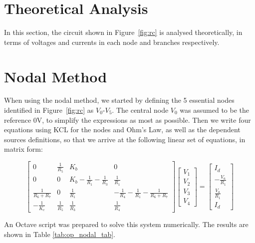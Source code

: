\section{Theoretical Analysis}
\label{sec:analysis}

In this section, the circuit shown in Figure~\ref{fig:rc} is analysed
theoretically, in terms of voltages and currents in each node and branches respectively.


\section{Nodal Method}

When using the nodal method, we started by defining the 5 essential nodes identified in Figure~\ref{fig:rc} as $V_0$-$V_5$. The central node $V_0$ was assumed to be the reference 0V, to simplify the expressions as most as possible.
Then we write four equations using KCL for the nodes and Ohm's Law, as well as the dependent sources definitions, so that we arrive at the following linear set of equations, in matrix form:


\[
  \begin{bmatrix}
    0                   & \frac{1}{R_5} & K_b                                 & 0                                              \\
    0                   & 0             & K_b - \frac{1}{R_1} - \frac{1}{R_3} & \frac{1}{R_1}                                  \\
    \frac{1}{R_6 + R_7} & 0             & \frac{1}{R_1}                       & -\frac{1}{R_4}-\frac{1}{R_1}-\frac{1}{R_6+R_7} \\
    -\frac{1}{K_c}      & \frac{1}{R_5} & \frac{1}{R_3}                       & \frac{1}{R_4}
  \end{bmatrix}
  \begin{bmatrix}
    V_1 \\ V_2 \\ V_3 \\ V_4
  \end{bmatrix}
  =
  \begin{bmatrix}
    I_d \\ -\frac{V_a}{R_1} \\ \frac{V_a}{R_1} \\ I_d
  \end{bmatrix}
\]

\hfill


An Octave script was prepared to solve this system numerically. The results are shown in Table \ref{tab:op_nodal_tab}.

